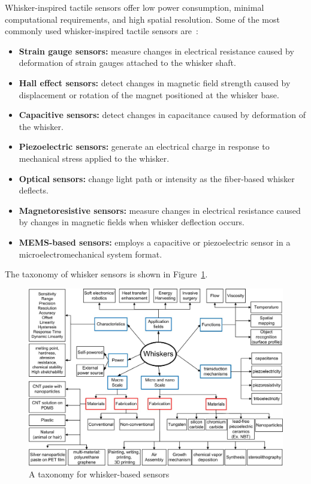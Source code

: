 Whisker-inspired tactile sensors offer low power consumption, minimal computational requirements, and high spatial resolution.
Some of the most commonly used whisker-inspired tactile sensors are~\cite{s22072705}:
\begin{itemize}
    \item \textbf{Strain gauge sensors:} measure changes in electrical resistance caused by deformation of strain gauges attached to the whisker shaft.
    \item \textbf{Hall effect sensors:} detect changes in magnetic field strength caused by displacement or rotation of the magnet positioned at the whisker base.
    \item \textbf{Capacitive sensors:} detect changes in capacitance caused by deformation of the whisker.
    \item \textbf{Piezoelectric sensors:} generate an electrical charge in response to mechanical stress applied to the whisker.
    \item \textbf{Optical sensors:} change light path or intensity as the fiber-based whisker deflects.
    \item \textbf{Magnetoresistive sensors:} measure changes in electrical resistance caused by changes in magnetic fields when whisker deflection occurs.
    \item \textbf{MEMS-based sensors:} employs a capacitive or piezoelectric sensor in a microelectromechanical system format.
\end{itemize}
The taxonomy of whisker sensors is shown in Figure~\ref{fig:taxonomy}.

\begin{figure}[htb]
    \centering
    \includegraphics[width=0.65\textheight]{figures/taxonomy}
    \caption{A taxonomy for whisker-based sensors\cite{s22072705}}
    \label{fig:taxonomy}
\end{figure}


